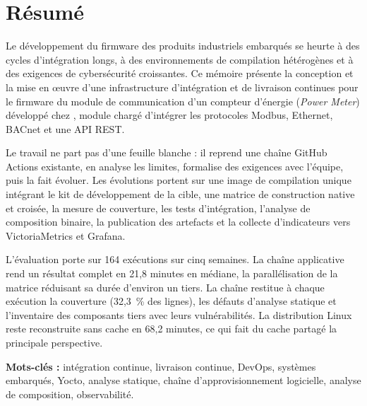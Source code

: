 \chapter*{Résumé}

Le développement du firmware des produits industriels embarqués se heurte à des
cycles d'intégration longs, à des environnements de compilation hétérogènes et
à des exigences de cybersécurité croissantes. Ce mémoire présente la conception et la mise
en œuvre d'une infrastructure d'intégration
et de livraison continues pour le firmware du module de communication d'un
compteur d'énergie (\emph{Power Meter}) développé chez \Entreprise, module
chargé d'intégrer les protocoles Modbus, Ethernet, BACnet et une API REST.

Le travail ne part pas d'une feuille blanche : il reprend une chaîne GitHub
Actions existante, en analyse les limites, formalise des exigences avec
l'équipe, puis la fait évoluer. Les évolutions portent sur une image de
compilation unique intégrant le kit de développement de la cible, une matrice
de construction native et croisée, la mesure de couverture, les tests
d'intégration, l'analyse de composition binaire, la publication des artefacts
et la collecte d'indicateurs vers VictoriaMetrics et Grafana.

L'évaluation porte sur 164 exécutions sur cinq semaines. La chaîne applicative
rend un résultat complet en 21,8 minutes en médiane, la parallélisation de la
matrice réduisant sa durée d'environ un tiers. La chaîne restitue à chaque
exécution la couverture (32,3~\% des lignes), les défauts d'analyse statique et
l'inventaire des composants tiers avec leurs vulnérabilités. La distribution
Linux reste reconstruite sans cache en 68,2 minutes, ce qui fait du cache partagé
la principale perspective.

\vspace{1cm}
\noindent\textbf{Mots-clés :} intégration continue, livraison continue, DevOps,
systèmes embarqués, Yocto, analyse statique, chaîne d'approvisionnement
logicielle, analyse de composition, observabilité.

